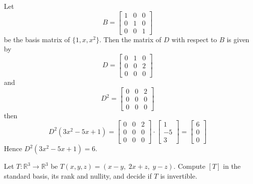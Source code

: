 \documentclass[11pt]{article}
\begin{document}
\begin{sol}
    Let 
    \[
        B = \begin{bmatrix}
            1&0&0\\
            0&1&0\\
            0&0&1
        \end{bmatrix}
    \]
    be the basis matrix of $\{1,x,x^2\}$. Then the matrix of $D$ with respect to $B$ is given by
    \[
        D =\begin{bmatrix}
            0&1&0\\
            0&0&2\\
            0&0&0
        \end{bmatrix}
    \]
    and 
    \[
        D^2 =\begin{bmatrix}
            0&0&2\\
            0&0&0\\
            0&0&0
        \end{bmatrix}
    \]
    then 
    \[
    D^2(3x^2 - 5x + 1) = \begin{bmatrix}
            0&0&2\\
            0&0&0\\
            0&0&0
        \end{bmatrix}\cdot\begin{bmatrix}
        1\\-5\\3
        \end{bmatrix}
        = \begin{bmatrix}
            6\\0\\0
        \end{bmatrix}
    \]
    Hence $D^2(3x^2-5x+1) = 6$.
\end{sol}
\begin{problem}
Let $T:\mathbb{R}^3\to\mathbb{R}^3$ be $T(x,y,z)=(x-y,\;2x+z,\;y-z)$. 
Compute $[T]$ in the standard basis, its rank and nullity, and decide if $T$ is invertible.
\end{problem}
\end{document}
